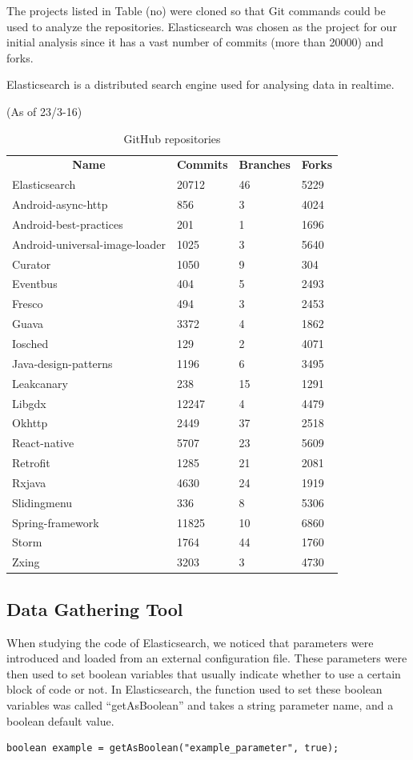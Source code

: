 The projects listed in Table (no) were cloned so that Git commands could be used to analyze the repositories. Elasticsearch was chosen as the project for our initial analysis since it has a vast number of commits (more than 20000) and forks.

Elasticsearch is a distributed search engine used for analysing data in realtime.  %

(As of 23/3-16)\\
\begin{table}
\begin{tabular}{ l l l l}
\hline
\multicolumn{1}{c}{\textbf{Name}} & \multicolumn{1}{c}{\textbf{Commits}} & \multicolumn{1}{c}{\textbf{Branches}} & \multicolumn{1}{c}{\textbf{Forks}}\\
Elasticsearch & 20712 & 46 & 5229\\
Android-async-http & 856 & 3 & 4024\\
Android-best-practices & 201 & 1 & 1696\\
Android-universal-image-loader & 1025 & 3 & 5640\\
Curator & 1050 & 9 & 304\\
Eventbus & 404 & 5 & 2493\\
Fresco & 494 & 3 & 2453\\
Guava & 3372 & 4 & 1862\\
Iosched & 129 & 2 & 4071\\
Java-design-patterns & 1196 & 6 & 3495\\
Leakcanary & 238 & 15 & 1291\\
Libgdx & 12247 & 4 & 4479\\
Okhttp & 2449 & 37 & 2518\\
React-native & 5707 & 23 & 5609\\
Retrofit & 1285 & 21 & 2081\\
Rxjava & 4630 & 24 & 1919\\
Slidingmenu & 336 & 8 & 5306\\
Spring-framework & 11825 & 10 & 6860\\
Storm & 1764 & 44 & 1760\\
Zxing & 3203 & 3 & 4730
\end{tabular}
\caption{GitHub repositories}\label{table:repositories}
\end{table}
\subsection{Data Gathering Tool}
When studying the code of Elasticsearch, we noticed that parameters were introduced and loaded from an external configuration file. These parameters were then used to set boolean variables that usually indicate whether to use a certain block of code or not. In Elasticsearch, the function used to set these boolean variables was called “getAsBoolean” and takes a string parameter name, and a boolean default value.\\
\lstset{language=Java}
\begin{lstlisting}[frame=single]
boolean example = getAsBoolean("example_parameter", true);
\end{lstlisting}

